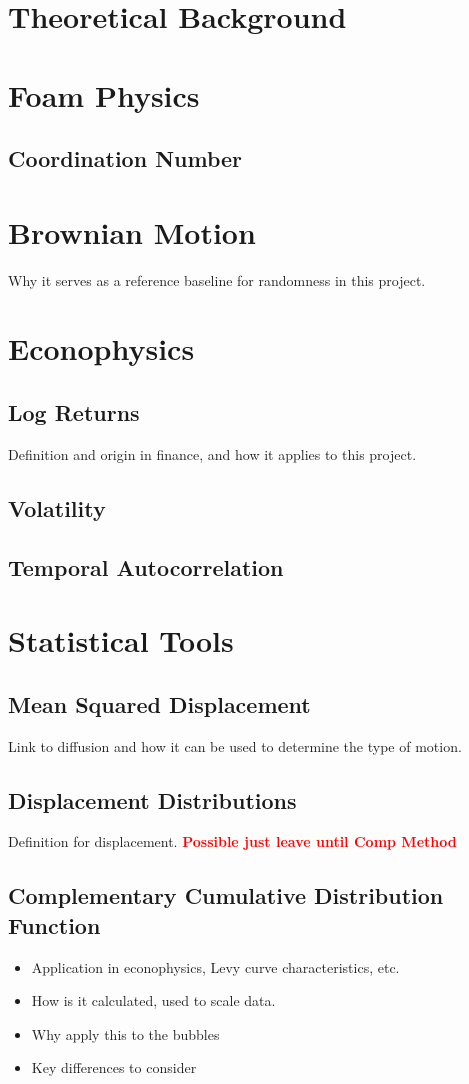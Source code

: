 \section{Theoretical Background} \label{sec:theoreticalbackground}
\section{Foam Physics}
\subsection{Coordination Number}



\section{Brownian Motion}
Why it serves as a reference baseline for randomness in this project.\\

\section{Econophysics}
\subsection{Log Returns}
Definition and origin in finance, and how it applies to this project.\\

\subsection{Volatility}

\subsection{Temporal Autocorrelation}




\section{Statistical Tools}
\subsection{Mean Squared Displacement}
Link to diffusion and how it can be used to determine the type of motion.\\

\subsection{Displacement Distributions}
Definition for displacement.
\textcolor{red}{\textbf{Possible just leave until Comp Method}}


\subsection{Complementary Cumulative Distribution Function}
\begin{itemize}
    \item Application in econophysics, Levy curve characteristics, etc.
    \item How is it calculated, used to scale data.
    \item Why apply this to the bubbles
    \item Key differences to consider
\end{itemize}